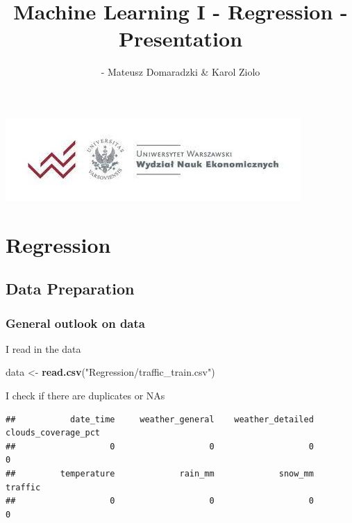 \documentclass[
]{article}
\title{Machine Learning I - Regression - Presentation}
\author{- Mateusz Domaradzki \& Karol Ziolo}
\date{}
\newenvironment{Shaded}{\begin{snugshade}}{\end{snugshade}}
\newcommand{\KeywordTok}[1]{\textcolor[rgb]{0.13,0.29,0.53}{\textbf{#1}}}
\newcommand{\NormalTok}[1]{#1}
\newcommand{\OperatorTok}[1]{\textcolor[rgb]{0.81,0.36,0.00}{\textbf{#1}}}
\newcommand{\StringTok}[1]{\textcolor[rgb]{0.31,0.60,0.02}{#1}}
\begin{document}
\maketitle

{
\setcounter{tocdepth}{3}
\tableofcontents
}
\includegraphics{image.jpg}

\hypertarget{regression}{%
\section{Regression}\label{regression}}

\hypertarget{data-preparation}{%
\subsection{Data Preparation}\label{data-preparation}}

\hypertarget{general-outlook-on-data}{%
\subsubsection{General outlook on data}\label{general-outlook-on-data}}

I read in the data

\begin{Shaded}
\begin{Highlighting}[]
\NormalTok{data <-}\StringTok{ }\KeywordTok{read.csv}\NormalTok{(}\StringTok{"Regression/traffic_train.csv"}\NormalTok{)}
\end{Highlighting}
\end{Shaded}

I check if there are duplicates or NAs

\begin{Shaded}
\end{Shaded}

\begin{verbatim}
##           date_time     weather_general    weather_detailed clouds_coverage_pct 
##                   0                   0                   0                   0 
##         temperature             rain_mm             snow_mm             traffic 
##                   0                   0                   0                   0
\end{verbatim}
\end{document}

